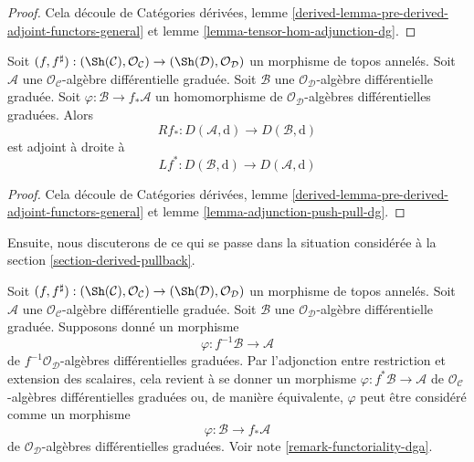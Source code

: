 \begin{proof}
Cela découle de Catégories dérivées, lemme \ref{derived-lemma-pre-derived-adjoint-functors-general}  et lemme \ref{lemma-tensor-hom-adjunction-dg}.
\end{proof}

\begin{lemma}
\label{lemma-derived-adjoint-push-pull}
Soit $(f, f^\sharp) : (\Sh(\mathcal{C}), \mathcal{O}_\mathcal{C}) \to (\Sh(\mathcal{D}), \mathcal{O}_\mathcal{D})$ un morphisme de topos annelés.
Soit $\mathcal{A}$ une $\mathcal{O}_\mathcal{C}$-algèbre différentielle graduée.
Soit $\mathcal{B}$ une $\mathcal{O}_\mathcal{D}$-algèbre différentielle graduée.
Soit $\varphi : \mathcal{B} \to f_*\mathcal{A}$ un homomorphisme de $\mathcal{O}_\mathcal{D}$-algèbres différentielles graduées. Alors
$$
Rf_* : 
D(\mathcal{A}, \text{d})
\longrightarrow
D(\mathcal{B}, \text{d})
$$
est adjoint à droite à
$$
Lf^* :
D(\mathcal{B}, \text{d})
\longrightarrow
D(\mathcal{A}, \text{d})
$$
\end{lemma}

\begin{proof}
Cela découle de Catégories dérivées, lemme \ref{derived-lemma-pre-derived-adjoint-functors-general}  et lemme \ref{lemma-adjunction-push-pull-dg}.
\end{proof}

\noindent
Ensuite, nous discuterons de ce qui se passe dans la situation considérée à la section \ref{section-derived-pullback}.

\medskip\noindent
Soit $(f, f^\sharp) : (\Sh(\mathcal{C}), \mathcal{O}_\mathcal{C}) \to (\Sh(\mathcal{D}), \mathcal{O}_\mathcal{D})$ un morphisme de topos annelés.
Soit $\mathcal{A}$ une $\mathcal{O}_\mathcal{C}$-algèbre différentielle graduée.
Soit $\mathcal{B}$ une $\mathcal{O}_\mathcal{D}$-algèbre différentielle graduée.
Supposons donné un morphisme
$$
\varphi : f^{-1}\mathcal{B} \to \mathcal{A}
$$
de $f^{-1}\mathcal{O}_\mathcal{D}$-algèbres différentielles graduées.
Par l'adjonction entre restriction et extension des scalaires, cela revient à se donner un morphisme $\varphi : f^*\mathcal{B} \to \mathcal{A}$ de $\mathcal{O}_\mathcal{C}$-algèbres différentielles graduées ou, de manière équivalente, $\varphi$ peut être considéré comme un morphisme
$$
\varphi : \mathcal{B} \to f_*\mathcal{A}
$$
de $\mathcal{O}_\mathcal{D}$-algèbres différentielles graduées.
Voir note \ref{remark-functoriality-dga}.

